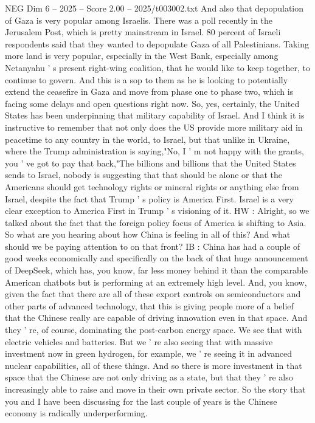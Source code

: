\begin{textsample}{NEG Dim 6 – 2025 – Score 2.00 – 2025/t003002.txt}
And also that depopulation of Gaza is very popular among Israelis.
There was a poll recently in the Jerusalem Post, which is pretty mainstream in Israel. 80 percent of Israeli respondents said that they wanted to depopulate Gaza of all Palestinians.
Taking more land is very popular, especially in the West Bank, especially among Netanyahu ' s present right-wing coalition, that he would like to keep together, to continue to govern.
And this is a sop to them as he is looking to potentially extend the ceasefire in Gaza and move from phase one to phase two, which is facing some delays and open questions right now.
So, yes, certainly, the United States has been underpinning that military capability of Israel.
And I think it is instructive to remember that not only does the US provide more military aid in peacetime to any country in the world, to Israel, but that unlike in Ukraine, where the Trump administration is saying,"No, I ' m not happy with the grants, you ' ve got to pay that back,"The billions and billions that the United States sends to Israel, nobody is suggesting that that should be alone or that the Americans should get technology rights or mineral rights or anything else from Israel, despite the fact that Trump ' s policy is America First.
Israel is a very clear exception to America First in Trump ' s visioning of it.
HW : Alright, so we talked about the fact that the foreign policy focus of America is shifting to Asia.
So what are you hearing about how China is feeling in all of this?
And what should we be paying attention to on that front?
IB : China has had a couple of good weeks economically and specifically on the back of that huge announcement of DeepSeek, which has, you know, far less money behind it than the comparable American chatbots but is performing at an extremely high level.
And, you know, given the fact that there are all of these export controls on semiconductors and other parts of advanced technology, that this is giving people more of a belief that the Chinese really are capable of driving innovation even in that space.
And they ' re, of course, dominating the post-carbon energy space.
We see that with electric vehicles and batteries.
But we ' re also seeing that with massive investment now in green hydrogen, for example, we ' re seeing it in advanced nuclear capabilities, all of these things.
And so there is more investment in that space that the Chinese are not only driving as a state, but that they ' re also increasingly able to raise and move in their own private sector.
So the story that you and I have been discussing for the last couple of years is the Chinese economy is radically underperforming.

\end{textsample}
